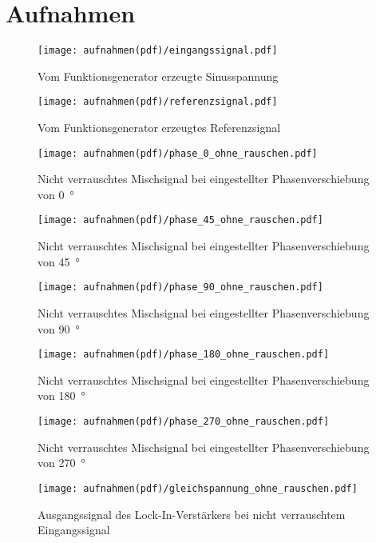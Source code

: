 \section{Aufnahmen}
\begin{figure}
\centering
\label{fig:anfangssignal_ohne_rausch}
\texttt{[image: aufnahmen(pdf)/eingangssignal.pdf]}
\caption{Vom Funktionsgenerator erzeugte Sinusspannung}
\end{figure}
\begin{figure}
\centering
\label{fig:referenzsignal_ohne_rausch}
\texttt{[image: aufnahmen(pdf)/referenzsignal.pdf]}
\caption{Vom Funktionsgenerator erzeugtes Referenzsignal}
\end{figure}
\begin{figure}
\centering
\label{fig:phase_0_nicht_verrauscht}
\texttt{[image: aufnahmen(pdf)/phase\_0\_ohne\_rauschen.pdf]}
\caption{Nicht verrauschtes Mischsignal bei eingestellter Phasenverschiebung von \SI{0}{\degree}}
\end{figure}
\begin{figure}
\centering
\label{fig:phase_45_nicht_verrauscht}
\texttt{[image: aufnahmen(pdf)/phase\_45\_ohne\_rauschen.pdf]}
\caption{Nicht verrauschtes Mischsignal bei eingestellter Phasenverschiebung von \SI{45}{\degree}}
\end{figure}
\begin{figure}
\centering
\label{fig:phase_90_nicht_verrauscht}
\texttt{[image: aufnahmen(pdf)/phase\_90\_ohne\_rauschen.pdf]}
\caption{Nicht verrauschtes Mischsignal bei eingestellter Phasenverschiebung von \SI{90}{\degree}}
\end{figure}
\begin{figure}
\centering
\label{fig:phase_180_nicht_verrauscht}
\texttt{[image: aufnahmen(pdf)/phase\_180\_ohne\_rauschen.pdf]}
\caption{Nicht verrauschtes Mischsignal bei eingestellter Phasenverschiebung von \SI{180}{\degree}}
\end{figure}
\begin{figure}
\centering
\label{fig:phase_270_nicht_verrauscht}
\texttt{[image: aufnahmen(pdf)/phase\_270\_ohne\_rauschen.pdf]}
\caption{Nicht verrauschtes Mischsignal bei eingestellter Phasenverschiebung von \SI{270}{\degree}}
\end{figure}
\begin{figure}
\centering
\label{fig:gleichspannung_ohne_rausch}
\texttt{[image: aufnahmen(pdf)/gleichspannung\_ohne\_rauschen.pdf]}
\caption{Ausgangssignal des Lock-In-Verstärkers bei nicht verrauschtem Eingangssignal}
\end{figure}
